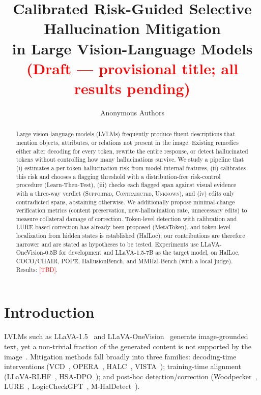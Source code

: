 \documentclass[11pt]{article}
\title{Calibrated Risk-Guided Selective Hallucination Mitigation\\in Large Vision-Language Models\\[4pt]
\large\textcolor{red}{(Draft --- provisional title; all results pending)}}
\author{Anonymous Authors}
\date{}
\newcommand{\TBD}{\textcolor{red}{[TBD]}}
\begin{document}
\maketitle

\begin{abstract}
Large vision-language models (LVLMs) frequently produce fluent descriptions that mention objects, attributes, or relations not present in the image. Existing remedies either alter decoding for every token, rewrite the entire response, or detect hallucinated tokens without controlling how many hallucinations survive. We study a pipeline that (i) estimates a per-token hallucination risk from model-internal features, (ii) calibrates this risk and chooses a flagging threshold with a distribution-free risk-control procedure (Learn-Then-Test), (iii) checks each flagged span against visual evidence with a three-way verdict (\textsc{Supported}, \textsc{Contradicted}, \textsc{Unknown}), and (iv) edits only contradicted spans, abstaining otherwise. We additionally propose minimal-change verification metrics (content preservation, new-hallucination rate, unnecessary edits) to measure collateral damage of correction. Token-level detection with calibration and LURE-based correction has already been proposed (MetaToken), and token-level localization from hidden states is established (HalLoc); our contributions are therefore narrower and are stated as hypotheses to be tested. Experiments use LLaVA-OneVision-0.5B for development and LLaVA-1.5-7B as the target model, on HalLoc, COCO/CHAIR, POPE, HallusionBench, and MMHal-Bench (with a local judge). Results: \TBD.
\end{abstract}

\section{Introduction}
\label{sec:intro}
LVLMs such as LLaVA-1.5~\cite{liu2024llava15} and LLaVA-OneVision~\cite{li2024llavaonevision} generate image-grounded text, yet a non-trivial fraction of the generated content is not supported by the image~\cite{rohrbach2018chair,li2023pope}. Mitigation methods fall broadly into three families: decoding-time interventions (VCD~\cite{leng2024vcd}, OPERA~\cite{huang2024opera}, HALC~\cite{chen2024halc}, VISTA~\cite{li2025vista}); training-time alignment (LLaVA-RLHF~\cite{sun2024llavarlhf}, HSA-DPO~\cite{xiao2025hsadpo}); and post-hoc detection/correction (Woodpecker~\cite{yin2024woodpecker}, LURE~\cite{zhou2024lure}, LogicCheckGPT~\cite{wu2024logiccheckgpt}, M-HalDetect~\cite{gunjal2024mhaldetect}).
\end{document}

